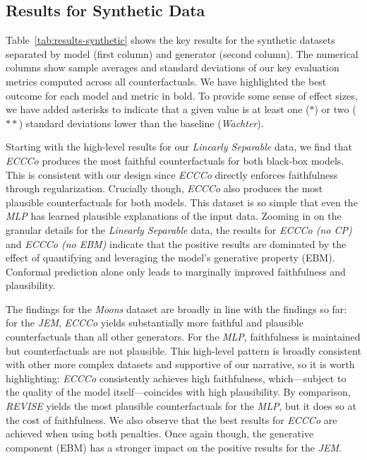 \subsection{Results for Synthetic Data}

Table~\ref{tab:results-synthetic} shows the key results for the synthetic datasets separated by model (first column) and generator (second column). The numerical columns show sample averages and standard deviations of our key evaluation metrics computed across all counterfactuals. We have highlighted the best outcome for each model and metric in bold. To provide some sense of effect sizes, we have added asterisks to indicate that a given value is at least one ($*$) or two ($**$) standard deviations lower than the baseline (\textit{Wachter}).

Starting with the high-level results for our \textit{Linearly Separable} data, we find that \textit{ECCCo} produces the most faithful counterfactuals for both black-box models. This is consistent with our design since \textit{ECCCo} directly enforces faithfulness through regularization. Crucially though, \textit{ECCCo} also produces the most plausible counterfactuals for both models. This dataset is so simple that even the \textit{MLP} has learned plausible explanations of the input data. Zooming in on the granular details for the \textit{Linearly Separable} data, the results for \textit{ECCCo (no CP)} and \textit{ECCCo (no EBM)} indicate that the positive results are dominated by the effect of quantifying and leveraging the model's generative property (EBM). Conformal prediction alone only leads to marginally improved faithfulness and plausibility.

The findings for the \textit{Moons} dataset are broadly in line with the findings so far: for the \textit{JEM}, \textit{ECCCo} yields substantially more faithful and plausible counterfactuals than all other generators. For the \textit{MLP}, faithfulness is maintained but counterfactuals are not plausible. This high-level pattern is broadly consistent with other more complex datasets and supportive of our narrative, so it is worth highlighting: \textit{ECCCo} consistently achieves high faithfulness, which---subject to the quality of the model itself---coincides with high plausibility. By comparison, \textit{REVISE} yields the most plausible counterfactuals for the \textit{MLP}, but it does so at the cost of faithfulness. We also observe that the best results for \textit{ECCCo} are achieved when using both penalties. Once again though, the generative component (EBM) has a stronger impact on the positive results for the \textit{JEM}.

